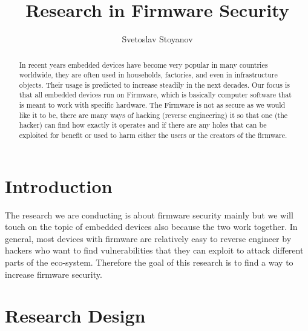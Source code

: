 \documentclass[]{report}
\title{Research in Firmware Security}
\author{Svetoslav Stoyanov}
\begin{document}
\maketitle

\begin{abstract}
	In recent years embedded devices have become very popular in many countries worldwide, they are often used in households, factories, and even in infrastructure objects. Their usage is predicted to increase steadily in the next decades. Our focus is that all embedded devices run on Firmware, which is basically computer software that is meant to work with specific hardware. The Firmware is not as secure as we would like it to be, there are many ways of hacking (reverse engineering) it so that one (the hacker) can find how exactly it operates and if there are any holes that can be exploited for benefit or used to harm either the users or the creators of the firmware.
\end{abstract}

\section{Introduction}
The research we are conducting is about firmware security mainly but we will touch on the topic of embedded devices also because the two work together. In general, most devices with firmware are relatively easy to reverse engineer by hackers who want to find vulnerabilities that they can exploit to attack different parts of the eco-system. Therefore the goal of this research is to find a way to increase firmware security.
\section{Research Design}
\end{document}
